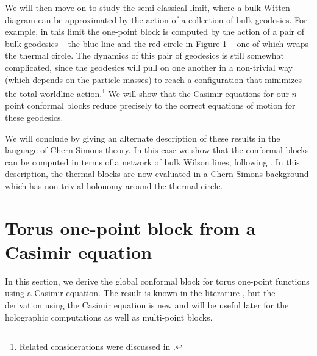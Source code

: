 \documentclass[12pt]{article}
\begin{document}
We will then move on to study the semi-classical limit, where a bulk Witten diagram can be approximated by the action of a collection of bulk geodesics.  For example, in this limit the one-point block is computed by the action of a pair of bulk geodesics -- the blue line and the red circle in Figure 1 -- one of which wraps the thermal circle.  The dynamics of this pair of geodesics is still somewhat complicated, since the geodesics will pull on one another in a non-trivial way (which depends on the particle masses) to reach a configuration that minimizes the total worldline action.\footnote{Related considerations were discussed in \cite{Alkalaev:2016ptm, Alkalaev:2016fok}.}
We will show that the Casimir equations for our $n$-point conformal blocks reduce precisely to the correct equations of motion for these geodesics.

We will conclude by giving an alternate description of these results in the language of Chern-Simons theory.  In this case we show that the conformal blocks can be computed in terms of a network of bulk Wilson lines, following \cite{Bhatta:2016hpz,Besken:2016ooo,Fitzpatrick:2016mtp}.  In this description, the thermal blocks are now evaluated in a Chern-Simons background which has non-trivial holonomy around the thermal circle.


\section{Torus one-point block from a Casimir equation}
\label{sec:torusonepointCasimir}


In this section, we derive the global conformal block for torus one-point functions using a Casimir equation. The result  is known in the literature \cite{Hadasz:2009db}, but the derivation using the Casimir equation is new and will be useful later for the holographic computations as well as multi-point blocks.
\end{document}
